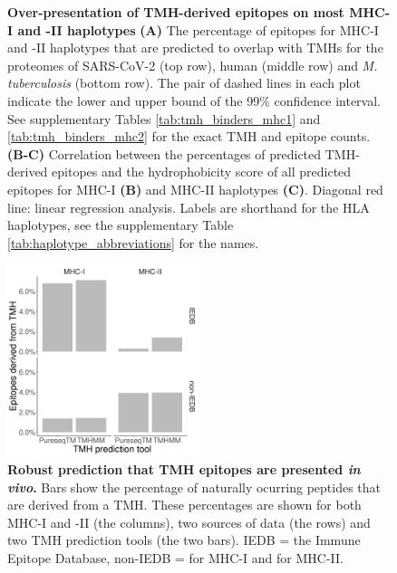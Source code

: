 \begin{figure}[!htbp]
\begin{subfigure}[t]{0.35\textwidth}
    \label{fig:hydrophobicity_2}
  \end{subfigure}  
  \caption{ \textbf{Over-presentation of TMH-derived epitopes on most MHC-I and -II haplotypes}
    \textbf{(A)} 
    The percentage of epitopes for MHC-I and -II haplotypes that are predicted to 
    overlap with TMHs for the proteomes of SARS-CoV-2 (top row), human (middle 
    row) and \emph{M. tuberculosis} (bottom row).
    The pair of dashed lines in each plot indicate the lower and upper bound of the 99\% confidence interval.
    See supplementary Tables \ref{tab:tmh_binders_mhc1} and \ref{tab:tmh_binders_mhc2}
    for the exact TMH and  epitope counts.
    \textbf{(B-C)}
    Correlation between the percentages of predicted TMH-derived epitopes
    and the hydrophobicity score of all predicted epitopes for MHC-I \textbf{(B)}
    and MHC-II haplotypes \textbf{(C)}. 
    Diagonal red line: linear regression analysis. 
    Labels are shorthand for the HLA haplotypes,
    see the supplementary Table \ref{tab:haplotype_abbreviations} for the names.
  }
\end{figure}


\clearpage

\thispagestyle{empty}

%
%
\begin{figure}[!htbp]
  \centering
  \includegraphics[width=0.5\textwidth]{bbbq_article_issue_157/results.png}
  \caption{
    \textbf{
      Robust prediction that TMH epitopes are presented \emph{in vivo}.
    }
    Bars show the percentage of naturally ocurring peptides
    that are derived from a TMH. These percentages are shown for
    both MHC-I and -II (the columns), two sources of data (the
    rows) and two TMH prediction tools (the two bars). 
    IEDB = the Immune Epitope Database, non-IEDB = 
    \cite{schellens2015comprehensive} for MHC-I and
    \cite{bergseng2015different} for MHC-II.
  }
  \label{fig:elution}
\end{figure}

